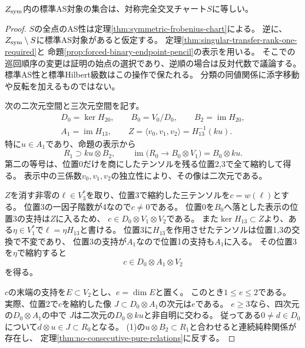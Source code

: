 \begin{theorem}[対称閉包のAS点の完全な認識]\label{thm:symmetric-closure-as-exact}
$Z_{\rm sym}$内の標準AS対象の集合は、対称完全交叉チャート$S$に等しい。
\end{theorem}
\begin{proof}
$S$の全点のAS性は定理\ref{thm:symmetric-frobenius-chart}による。
逆に、$Z_{\rm sym}\setminus S$に標準AS対象があると仮定する。
定理\ref{thm:singular-transfer-rank-one-required}と
命題\ref{prop:forced-binary-endpoint-pencil}の表示を用いる。
そこでの巡回順序の変更は証明の始点の選択であり、逆順の場合は反対代数で議論する。
標準AS性と標準Hilbert級数はこの操作で保たれる。
分類の同値関係に添字移動や反転を加えるものではない。

次の二次元空間と三次元空間を記す。
\[
 \begin{gathered}
 D_0=\ker H_{20},\qquad B_0=V_0/D_0,\qquad
 B_2=\operatorname{im}H_{20},\\
 A_1=\operatorname{im}H_{13},\qquad
 Z=\langle v_0,v_1,v_2\rangle=H_{13}^{-1}(ku).
 \end{gathered}
\]
特に$u\in A_1$であり、命題の表示から
\[
 R_1\supset ku\otimes B_2,\qquad
 \operatorname{im}\bigl(R_0\longrightarrow B_0\otimes V_1\bigr)
       =B_0\otimes ku.                                      \tag{1}
\]
第二の等号は、位置0だけを商にしたテンソルを残る位置2,3で全て縮約して得る。
表示中の三係数$v_0,v_1,v_2$の独立性により、その像は二次元である。

$Z$を消す非零の$\ell\in V_3^*$を取り、位置3で縮約した三テンソルを$c=w(\ell)$とする。
位置3の一因子階数が4なので$c\ne0$である。
位置0を$B_0$へ落とした表示の位置3の支持は$Z$に入るため、
$c\in D_0\otimes V_1\otimes V_2$である。
また$\ker H_{13}\subset Z$より、ある$\eta\in V_1^*$で$\ell=\eta H_{13}$と書ける。
位置3に$H_{13}$を作用させたテンソルは位置1,3の交換で不変であり、
位置3の支持が$A_1$なので位置1の支持も$A_1$に入る。
その位置3を$\eta$で縮約すると
\[
                         c\in D_0\otimes A_1\otimes V_2                 \tag{2}
\]
を得る。

$c$の末端の支持を$E\subset V_2$とし、$e=\dim E$と置く。
このとき$1\le e\le2$である。
実際、位置2で$c$を縮約した像
$J\subset D_0\otimes A_1$の次元は$e$である。
$e\ge3$なら、四次元の$D_0\otimes A_1$の中で
$J$は二次元の$D_0\otimes ku$と非自明に交わる。
従ってある$0\ne d\in D_0$について$d\otimes u\in J\subset R_0$となる。
(1)の$u\otimes B_2\subset R_1$と合わせると連続純粋関係が存在し、
定理\ref{thm:no-consecutive-pure-relations}に反する。


\end{proof}
